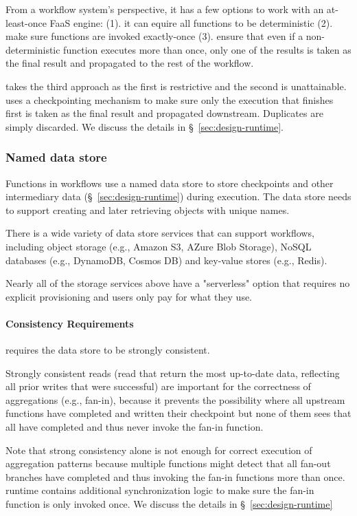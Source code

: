 From a workflow system's perspective, it has a few options to work with an
at-least-once FaaS engine: (1). it can equire all functions to be
deterministic (2). make sure functions are invoked exactly-once (3). ensure
that even if a non-deterministic function executes more than once, only one of
the results is taken as the final result and propagated to the rest of the
workflow.

\name{} takes the third approach as the first is restrictive and the second is
unattainable. \name{} uses a checkpointing mechanism to make sure only the
execution that finishes first is taken as the final result and propagated
downstream. Duplicates are simply discarded. We discuss the details in
\S~\ref{sec:design-runtime}.

\subsubsection{Named data store}

Functions in \name{} workflows use a named data store to store checkpoints and
other intermediary data (\S~\ref{sec:design-runtime}) during execution. The
data store needs to support creating and later retrieving objects with unique
names.

There is a wide variety of data store services that can support \name{}
workflows, including object storage (e.g., Amazon S3, AZure Blob Storage),
NoSQL databases (e.g., DynamoDB, Cosmos DB) and key-value stores (e.g.,
Redis).

Nearly all of the storage services above have a "serverless" option that
requires no explicit provisioning and users only pay for what they use.

\paragraph{Consistency Requirements}

\name{} requires the data store to be strongly consistent.

Strongly consistent reads (read that return the most up-to-date data,
reflecting all prior writes that were successful) are important for the
correctness of aggregations (e.g., fan-in), because it prevents the
possibility where all upstream functions have completed and written their
checkpoint but none of them sees that all have completed and thus never invoke
the fan-in function.

Note that strong consistency alone is not enough for correct execution of
aggregation patterns because multiple functions might detect that all fan-out
branches have completed and thus invoking the fan-in functions more than once.
\name{} runtime contains additional synchronization logic to make sure the fan-in
function is only invoked once. We discuss the details in
\S~\ref{sec:design-runtime}


